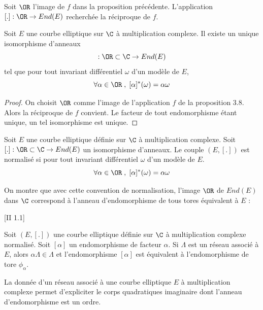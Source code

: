 Soit $\OR$ l'image de $f$ dans la proposition précédente. L'application $[.] : \OR \rightarrow End(E)$ recherchée la réciproque de $f$. 

\begin{Prop}
	Soit $E$ une courbe elliptique sur $\C$ à multiplication complexe. Il existe un unique isomorphisme d'anneaux
	\begin{equation*}
		[.] : \OR\subset\C\rightarrow End(E)
	\end{equation*}
	tel que pour tout invariant différentiel $\omega$ d'un modèle de $E$,
	\begin{equation*}
		\forall\alpha\in\OR\;,\; [\alpha]^{*}(\omega) = \alpha\omega
	\end{equation*}
\end{Prop}

\begin{proof}
	On choisit $\OR$ comme l'image de l'application $f$ de la proposition 3.8. Alors la réciproque de $f$ convient. Le facteur de tout endomorphisme étant unique, un tel isomorphisme est unique. 
\end{proof}

\begin{Def}
	Soit $E$ une courbe elliptique définie sur $\C$ à multiplication complexe. Soit $[.] : \OR\subset\C\rightarrow End(E)$ un isomorphisme d'anneaux. Le couple $(E,[.])$ est normalisé si pour tout invariant différentiel $\omega$ d'un modèle de $E$.
	\begin{equation*}
		\forall\alpha\in\OR\;,\; [\alpha]^{*}(\omega) = \alpha\omega
	\end{equation*}
\end{Def}

On montre que avec cette convention de normalisation, l'image $\OR$ de $End(E)$ dans $\C$ correspond à l'anneau d'endomorphisme de tous tores équivalent à $E$ :


\begin{Prop}\cite{Sil94}[II 1.1]
	
	Soit $(E,[.])$ une courbe elliptique définie sur $\C$ à multiplication complexe normalisé. Soit $[\alpha]$ un endomorphisme de facteur $\alpha$. Si $\Lambda$ est un réseau associé à $E$, alors $\alpha\Lambda\in\Lambda$ et l'endomorphisme $[\alpha]$ est équivalent à l'endomorphisme de tore $\phi_{\alpha}$.
\end{Prop}

La donnée d'un réseau associé à une courbe elliptique $E$ à multiplication complexe permet d'expliciter le corps quadratiques imaginaire dont l'anneau d'endomorphisme est un ordre.

